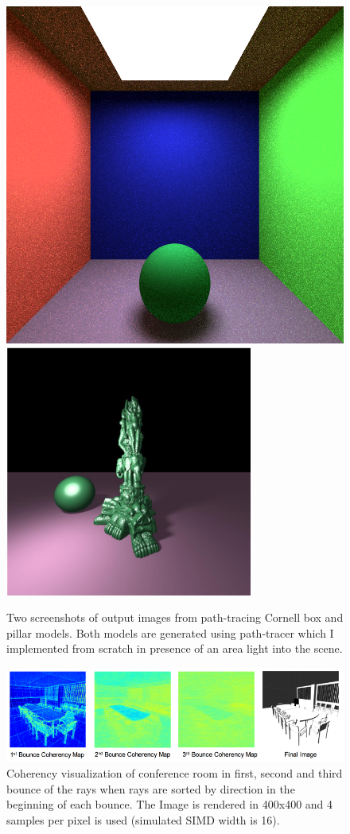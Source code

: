 \documentclass[]{article}
\begin{document}
\begin{description}
	\item[] 
	\item[] 
\end{description}


\begin{figure}[ht!]
	\centering
	\includegraphics[width=0.45\linewidth]{gr_result2.png}		\includegraphics[width=0.45\linewidth]{gr_result.png}
	\caption{Two screenshots of output images from path-tracing Cornell box and pillar models. Both models are generated using path-tracer which I implemented from scratch in presence of an area light into the scene.}
	\label{fig:boat1}
\end{figure}


\begin{figure}[ht!]
	\centering
	\includegraphics[width=\linewidth]{gr_compare.png}
	\caption{Coherency visualization of conference room in first, second and third bounce of the rays when rays are sorted by direction in the beginning of each bounce. The Image is rendered in 400x400 and 4 samples per pixel is used (simulated SIMD width is 16).}
	\label{fig:boat1}
\end{figure}
\end{document}
